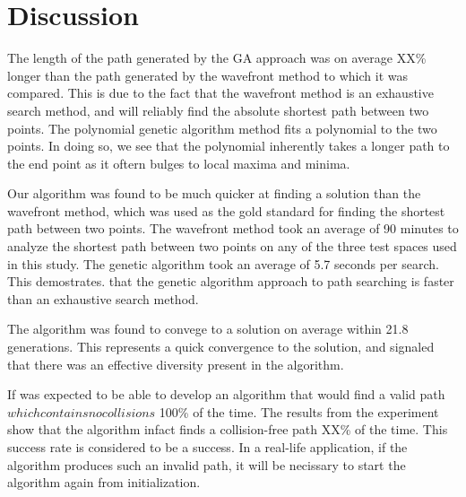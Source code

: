	
	
\section{Discussion}

The length of the path generated by the GA approach was on average XX\% longer than the path generated by the wavefront method to which it was compared. This is due to the fact that the wavefront method is an exhaustive search method, and will reliably find the absolute shortest path between two points. The polynomial genetic algorithm method fits a polynomial to the two points. In doing so, we see that the polynomial inherently takes a longer path to the end point as it oftern bulges to local maxima and minima.

Our algorithm was found to be much quicker at finding a solution than the wavefront method, which was used as the gold standard for finding the shortest path between two points. The wavefront method took an average of 90 minutes to analyze the shortest path between two points on any of the three test spaces used in this study. The genetic algorithm took an average of 5.7 seconds per search. This demostrates. that the genetic algorithm approach to path searching is faster than an exhaustive search method.

The algorithm was found to convege to a solution on average within 21.8 generations. This represents a quick convergence to the solution, and signaled that there was an effective diversity present in the algorithm.

If was expected to be able to develop an algorithm that would find a valid path \(which contains no collisions\) 100\% of the time. The results from the experiment show that the algorithm infact finds a collision-free path XX\% of the time. This success rate is considered to be a success. In a real-life application, if the algorithm produces such an invalid path, it will be necissary to start the algorithm again from initialization. 

